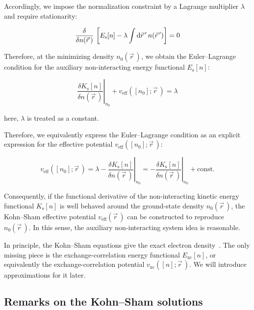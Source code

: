 Accordingly, we impose the normalization constraint by a Lagrange multiplier $\lambda$ and require stationarity:

\begin{equation}
    \frac{\delta}{\delta n(\vec{r}\,)}\,\left[
        E_\mathrm{s}[n]-\lambda\int\mathrm{d}{\vec{r}\,'}\,n(\vec{r}\,')
    \right]=0
\label{KS_auxiliary_density_stationarity}
\end{equation}

Therefore, at the minimizing density $n_0(\vec{r}\,)$,
we obtain the Euler--Lagrange condition for the auxiliary non-interacting energy functional $E_\mathrm{s}[n]$:

\begin{equation}
    \left.\frac{\delta K_\mathrm{s}[n]}{\delta n(\vec{r}\,)}\right|_{n_0}+v_\mathrm{eff}([n_0];\vec{r}\,)=\lambda
\label{KS_auxiliary_EL_condition}
\end{equation}

here, $\lambda$ is treated as a constant.

Therefore, we equivalently express the Euler--Lagrange condition as an explicit expression for the effective potential $v_\mathrm{eff}([n_0];\vec{r}\,)$:

\begin{equation}
    v_\mathrm{eff}([n_0];\vec{r}\,)
    = \lambda-\left.\frac{\delta K_\mathrm{s}[n]}{\delta n(\vec{r}\,)}\right|_{n_0}
    = -\left.\frac{\delta K_\mathrm{s}[n]}{\delta n(\vec{r}\,)}\right|_{n_0}+\mathrm{const.}
\label{KS_auxiliary_v_eff_from_Ts}
\end{equation}

Consequently, if the functional derivative of the non-interacting kinetic energy functional $K_\mathrm{s}[n]$ is well behaved around the ground-state density $n_0(\vec{r}\,)$,
the Kohn--Sham effective potential $v_\mathrm{eff}(\vec{r}\,)$ can be constructed to reproduce $n_0(\vec{r}\,)$.
In this sense, the auxiliary non-interacting system idea is reasonable.

In principle, the Kohn--Sham equations give the exact electron density~\cite{wagner2014kohn}.
The only missing piece is the exchange-correlation energy functional $E_\mathrm{xc}[n]$, or equivalently the exchange-correlation potential $v_\mathrm{xc}([n];\vec{r}\,)$.
We will introduce approximations for it later.

\FloatBarrier
\subsection{Remarks on the Kohn--Sham solutions}

